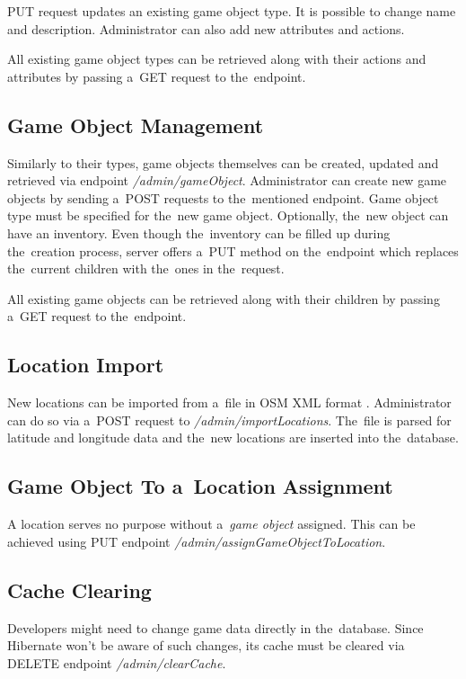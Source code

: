 	PUT request updates an existing game object type. It is possible to change name and description. Administrator can also add new attributes and actions. 
		
	All existing game object types can be retrieved along with their actions and attributes by passing a~GET request to the~endpoint.
	
	\subsection{Game Object Management}
	Similarly to their types, game objects themselves can be created, updated and retrieved via endpoint \textit{/admin/gameObject}. Administrator can create new game objects by sending a~POST requests to the~mentioned endpoint. Game object type must be specified for the~new game object. Optionally, the~new object can have an inventory. Even though the~inventory can be filled up during the~creation process, server offers a~PUT method on the~endpoint which replaces the~current children with the~ones in the~request.
	
	All existing game objects can be retrieved along with their children by passing a~GET request to the~endpoint.
	
	\subsection{Location Import}
	New locations can be imported from a~file in OSM XML format \cite{osmxml}. Administrator can do so via a~POST request to \textit{/admin/importLocations}. The~file is parsed for latitude and longitude data and the~new locations are inserted into the~database.
	
	\subsection{Game Object To a~Location Assignment}
	A location serves no purpose without a~\textit{game object} assigned. This can be achieved using PUT endpoint 
	\textit{/admin/assignGameObjectToLocation}.
	
	\subsection{Cache Clearing}
	Developers might need to change game data directly in the~database. Since Hibernate won't be aware of such changes, its cache must be cleared via DELETE endpoint \textit{/admin/clearCache}.
	
